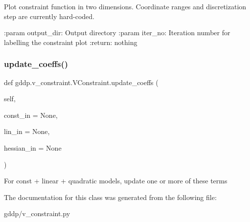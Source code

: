 \begin{DoxyVerb}Plot constraint function in two dimensions. Coordinate ranges and discretization step
are currently hard-coded.

:param output_dir: Output directory
:param iter_no: Iteration number for labelling the constraint plot
:return: nothing
\end{DoxyVerb}
 \mbox{\label{classgddp_1_1v__constraint_1_1_v_constraint_ab77b4159e16244c9f999b0c3e622181d}} 
\subsubsection{\texorpdfstring{update\_coeffs()}{update\_coeffs()}}
{\footnotesize\ttfamily def gddp.\+v\+\_\+constraint.\+V\+Constraint.\+update\+\_\+coeffs (\begin{DoxyParamCaption}\item[{}]{self,  }\item[{}]{const\+\_\+in = {\ttfamily None},  }\item[{}]{lin\+\_\+in = {\ttfamily None},  }\item[{}]{hessian\+\_\+in = {\ttfamily None} }\end{DoxyParamCaption})}

\begin{DoxyVerb}For const + linear + quadratic models, update one or more of these terms\end{DoxyVerb}
 

The documentation for this class was generated from the following file\+:\begin{DoxyCompactItemize}
\item 
gddp/v\+\_\+constraint.\+py\end{DoxyCompactItemize}
